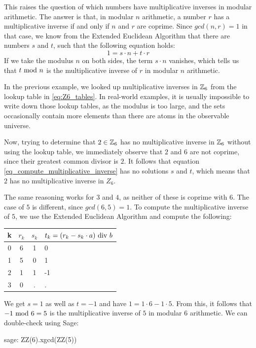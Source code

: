 This raises the question of which numbers have multiplicative inverses in modular arithmetic. The answer is that, in modular $n$ arithmetic, a number $r$ has a multiplicative inverse if and only if $n$ and $r$ are coprime. Since $gcd(n,r)=1$ in that case, we know from the Extended Euclidean Algorithm that there are numbers $s$ and $t$, such that the following equation holds:
\begin{equation}
\label{eq_compute_multiplicative_inverse}
1 = s\cdot n + t\cdot r
\end{equation}
If we take the modulus $n$ on both sides, the term $s\cdot n$ vanishes, which tells us that $t \text{ mod } n$ is the multiplicative inverse of $r$ in modular $n$ arithmetic.
\begin{example} In the previous example, we looked up multiplicative inverses in $\mathbb{Z}_6$ from the lookup table in \eqref{eq:Z6_tables}. In real-world examples, it is  usually impossible to write down those lookup tables, as the modulus is too large, and the sets occasionally contain more elements than there are atoms in the observable universe.

Now, trying to determine that $2\in \mathbb{Z}_6$ has no multiplicative inverse in $\mathbb{Z}_6$ without using the lookup table, we immediately observe that $2$ and $6$ are not coprime, since their greatest common divisor is $2$. It follows that equation \ref{eq_compute_multiplicative_inverse} has no solutions $s$ and $t$, which means that $2$ has no multiplicative inverse in $Z_6$.

The same reasoning works for $3$ and $4$, as neither of these is coprime with $6$. The case of  $5$ is different, since $gcd(6,5)=1$. To compute the multiplicative inverse of $5$, we use the Extended Euclidean Algorithm and compute  the following:
\begin{center}
  \begin{tabular}{c | c c l}
    k & $ r_k $ & $ s_k $ & $ t_k = (r_k-s_k \cdot a) \text{ div } b $ \\\hline
    0 & 6 & 1 & 0 \\
    1 & 5 & 0 & 1 \\
    2 & 1 & 1 & -1 \\
    3 & 0 & . & . \\
  \end{tabular}
\end{center}

We get $s=1$ as well as $t=-1$ and have $1 = 1\cdot 6 -1\cdot 5$. From this, it follows that $-1 \text{ mod } 6=5$ is the multiplicative inverse of $5$ in modular $6$ arithmetic. We can double-check using  Sage:
\begin{sagecommandline}
sage: ZZ(6).xgcd(ZZ(5))
\end{sagecommandline}
\end{example}
